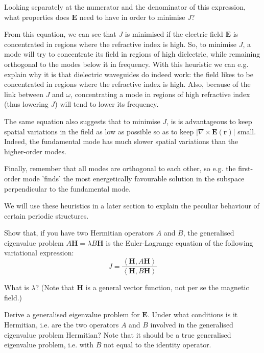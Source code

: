 \begin{cue}
Looking separately at the numerator and the denominator of this expression, what properties does ${\mathbf E}$ need to have in order to minimise $J$?   
\end{cue}

From this equation, we can see that $J$ is minimised if the electric field ${\mathbf E}$ is concentrated in regions where the refractive index is high. So, to minimise $J$, a mode will try to concentrate its field in regions of high dielectric, while remaining orthogonal to the modes below it in frequency. With this heuristic we can e.g. explain why it is that dielectric waveguides do indeed work: the field likes to be concentrated in regions where the refractive index is high. Also, because of the link between $J$ and $\omega$, concentrating a mode in regions of high refractive index (thus lowering $J$) will tend to lower its frequency.

The same equation also suggests that to minimise $J$, is is advantageous to keep spatial variations in the field as low as possible so as to keep  $\left| \nabla \times {\mathbf E({\mathbf r})} \right |$ small. Indeed, the fundamental mode has much slower spatial variations than the higher-order modes.

Finally, remember that all modes are orthogonal to each other, so e.g. the first-order mode 'finds' the most energetically favourable solution in the subspace perpendicular to the fundamental mode.

We will use these heuristics in a later section to explain the peculiar behaviour of certain periodic structures.

\pagebreak

\begin{exer}
Show that, if you have two Hermitian operators $A$ and $B$, the generalised eigenvalue problem $A {\mathbf H} = \lambda B {\mathbf H}$ is the Euler-Lagrange equation of the following variational expression: \\

$$J = \frac{\left\langle {\mathbf H} , A {\mathbf H}\right\rangle}{\left\langle {\mathbf H} , B {\mathbf H}\right\rangle}$$

What is $\lambda$? (Note that ${\mathbf H}$ is a general vector function, not per se the magnetic field.)

\end{exer}

\begin{exer}
Derive a generalised eigenvalue problem for $\mathbf E$. Under what conditions is it Hermitian, i.e. are the two operators $A$ and $B$ involved in the generalised eigenvalue problem Hermitian? Note that it should be a true generalised eigenvalue problem, i.e. with $B$ not equal to the identity operator.

\end{exer}

